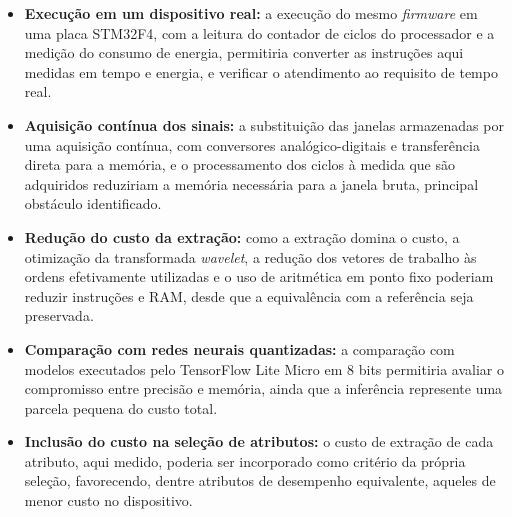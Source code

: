 \documentclass[
	12pt,				%
	openright,			%
	oneside,			%
	a4paper,			%
	english,			%
	brazil,				%
	]{abntex2}
\begin{document}
\begin{itemize}
    \item \textbf{Execução em um dispositivo real:} a execução do mesmo \textit{firmware} em uma placa STM32F4, com a leitura do contador de ciclos do processador e a medição do consumo de energia, permitiria converter as instruções aqui medidas em tempo e energia, e verificar o atendimento ao requisito de tempo real.

    \item \textbf{Aquisição contínua dos sinais:} a substituição das janelas armazenadas por uma aquisição contínua, com conversores analógico-digitais e transferência direta para a memória, e o processamento dos ciclos à medida que são adquiridos reduziriam a memória necessária para a janela bruta, principal obstáculo identificado.

    \item \textbf{Redução do custo da extração:} como a extração domina o custo, a otimização da transformada \textit{wavelet}, a redução dos vetores de trabalho às ordens efetivamente utilizadas e o uso de aritmética em ponto fixo poderiam reduzir instruções e RAM, desde que a equivalência com a referência seja preservada.

    \item \textbf{Comparação com redes neurais quantizadas:} a comparação com modelos executados pelo TensorFlow Lite Micro \cite{david_tflm} em 8 bits permitiria avaliar o compromisso entre precisão e memória, ainda que a inferência represente uma parcela pequena do custo total.

    \item \textbf{Inclusão do custo na seleção de atributos:} o custo de extração de cada atributo, aqui medido, poderia ser incorporado como critério da própria seleção, favorecendo, dentre atributos de desempenho equivalente, aqueles de menor custo no dispositivo.
\end{itemize}

%

\postextual


\end{document}
